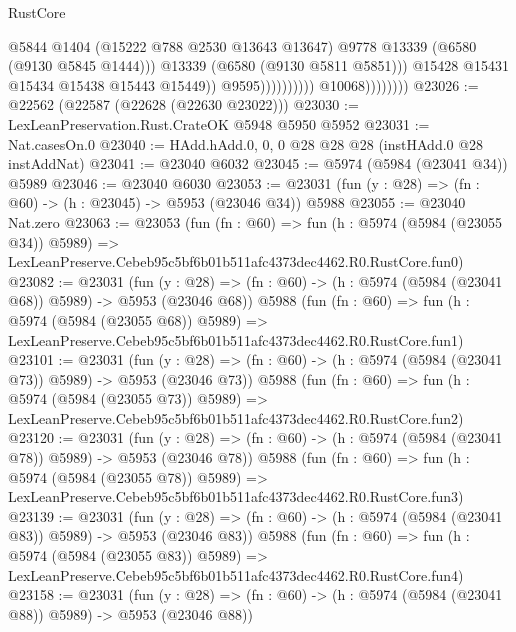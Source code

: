 \begin{lexlean}{RustCore}
\begin{coremodule}
                                                @5844
                                                @1404
                                                (@15222 @788 @2530 @13643 @13647)
                                                @9778
                                                @13339
                                                (@6580 (@9130 @5845 @1444)))
                                              @13339
                                              (@6580 (@9130 @5811 @5851)))
                                            @15428
                                            @15431
                                            @15434
                                            @15438
                                            @15443
                                            @15449))
                                        @9595))))))))))
                    @10068))))))))
@23026 := @22562 (@22587 (@22628 (@22630 @23022)))
@23030 := LexLeanPreservation.Rust.CrateOK @5948 @5950 @5952
@23031 := Nat.casesOn.{0}
@23040 := HAdd.hAdd.{0, 0, 0} @28 @28 @28 (instHAdd.{0} @28 instAddNat)
@23041 := @23040 @6032
@23045 := @5974 (@5984 (@23041 @34)) @5989
@23046 := @23040 @6030
@23053 := @23031 (fun (y : @28) => (fn : @60) -> (h : @23045) -> @5953 (@23046 @34)) @5988
@23055 := @23040 Nat.zero
@23063 := @23053
    (fun (fn : @60) =>
    fun (h : @5974 (@5984 (@23055 @34)) @5989) =>
    LexLeanPreserve.Cebeb95c5bf6b01b511afc4373dec4462.R0.RustCore.fun0)
@23082 := @23031
    (fun (y : @28) => (fn : @60) -> (h : @5974 (@5984 (@23041 @68)) @5989) -> @5953 (@23046 @68))
    @5988
    (fun (fn : @60) =>
    fun (h : @5974 (@5984 (@23055 @68)) @5989) =>
    LexLeanPreserve.Cebeb95c5bf6b01b511afc4373dec4462.R0.RustCore.fun1)
@23101 := @23031
    (fun (y : @28) => (fn : @60) -> (h : @5974 (@5984 (@23041 @73)) @5989) -> @5953 (@23046 @73))
    @5988
    (fun (fn : @60) =>
    fun (h : @5974 (@5984 (@23055 @73)) @5989) =>
    LexLeanPreserve.Cebeb95c5bf6b01b511afc4373dec4462.R0.RustCore.fun2)
@23120 := @23031
    (fun (y : @28) => (fn : @60) -> (h : @5974 (@5984 (@23041 @78)) @5989) -> @5953 (@23046 @78))
    @5988
    (fun (fn : @60) =>
    fun (h : @5974 (@5984 (@23055 @78)) @5989) =>
    LexLeanPreserve.Cebeb95c5bf6b01b511afc4373dec4462.R0.RustCore.fun3)
@23139 := @23031
    (fun (y : @28) => (fn : @60) -> (h : @5974 (@5984 (@23041 @83)) @5989) -> @5953 (@23046 @83))
    @5988
    (fun (fn : @60) =>
    fun (h : @5974 (@5984 (@23055 @83)) @5989) =>
    LexLeanPreserve.Cebeb95c5bf6b01b511afc4373dec4462.R0.RustCore.fun4)
@23158 := @23031
    (fun (y : @28) => (fn : @60) -> (h : @5974 (@5984 (@23041 @88)) @5989) -> @5953 (@23046 @88))

\end{coremodule}
\end{lexlean}
